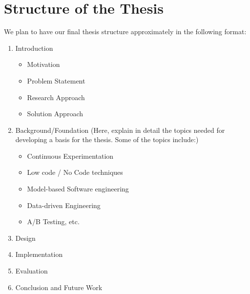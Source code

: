 \chapter{Structure of the Thesis} \label{sec:structure}

We plan to have our final thesis structure approximately in the following format: 

\begin{enumerate}
	\item Introduction
	\begin{itemize}
		\item Motivation
		\item Problem Statement
		\item Research Approach
		\item Solution Approach
	\end{itemize}
	\item Background/Foundation (Here, explain in detail the topics needed for developing a basis for the thesis. Some of the topics include:)
	\begin{itemize}
		\item Continuous Experimentation
		\item Low code / No Code techniques
		\item Model-based Software engineering
		\item Data-driven Engineering
		\item A/B Testing, etc. 
	\end{itemize}
	\item Design 
	\item Implementation 
	\item Evaluation
	\item Conclusion and Future Work
\end{enumerate}